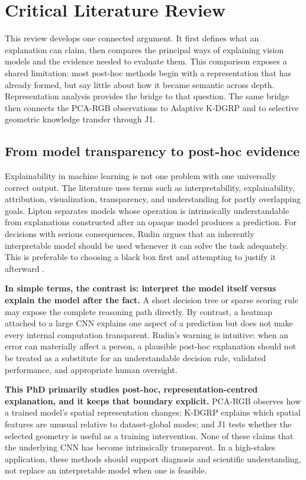\section{Critical Literature Review}\label{sec:related-work}

This review develops one connected argument. It first defines what an
explanation can claim, then compares the principal ways of explaining vision
models and the evidence needed to evaluate them. This comparison exposes a
shared limitation: most post-hoc methods begin with a representation that has
already formed, but say little about how it became semantic across depth.
Representation analysis provides the bridge to that question. The same bridge
then connects the PCA-RGB observations to Adaptive K-DGRP and to selective
geometric knowledge transfer through J1.

\subsection{From model transparency to post-hoc evidence}

Explainability in machine learning is not one problem with one universally
correct output. The literature uses terms such as interpretability,
explainability, attribution, visualization, transparency, and understanding for
partly overlapping goals. Lipton separates models whose operation is
intrinsically understandable from explanations constructed after an opaque
model produces a prediction. For decisions with serious consequences, Rudin
argues that an inherently interpretable model should be used whenever it can
solve the task adequately. This is preferable to choosing a black box first and
attempting to justify it afterward
\cite{lipton2018mythos,rudin2019stop}.

\textbf{In simple terms, the contrast is: interpret the model itself versus
explain the model after the fact.} A short decision tree or sparse scoring rule
may expose the complete reasoning path directly. By contrast, a heatmap attached
to a large CNN explains one aspect of a prediction but does not make every
internal computation transparent. Rudin's warning is intuitive: when an error
can materially affect a person, a plausible post-hoc explanation should not be
treated as a substitute for an understandable decision rule, validated
performance, and appropriate human oversight.

\textbf{This PhD primarily studies post-hoc, representation-centred
explanation, and it keeps that boundary explicit.} PCA-RGB observes how a
trained model's spatial representation changes; K-DGRP explains which spatial
features are unusual relative to dataset-global modes; and J1 tests whether the
selected geometry is useful as a training intervention. None of these claims
that the underlying CNN has become intrinsically transparent. In a high-stakes
application, these methods should support diagnosis and scientific
understanding, not replace an interpretable model when one is feasible.

